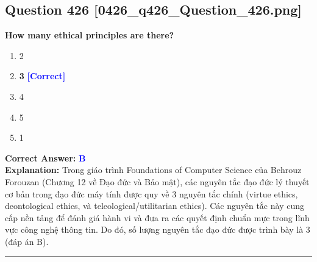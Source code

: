 \documentclass[11pt,a4paper]{article}
\begin{document}
\begin{minipage}{\textwidth}
\subsection*{Question 426 \quad \footnotesize{[0426\_q426\_Question\_426.png]}}
\noindent \textbf{How many ethical principles are there?}

\begin{enumerate}[label=\Alph*.]
    \item 2
    \item \textbf{3} \hfill \textcolor{blue}{\textbf{[Correct]}}
    \item 4
    \item 5
    \item 1
\end{enumerate}

\noindent \textbf{Correct Answer:} \textcolor{blue}{\textbf{B}} \\[2pt]
\noindent \textbf{Explanation:} Trong giáo trình Foundations of Computer Science của Behrouz Forouzan (Chương 12 về Đạo đức và Bảo mật), các nguyên tắc đạo đức lý thuyết cơ bản trong đạo đức máy tính được quy về 3 nguyên tắc chính (virtue ethics, deontological ethics, và teleological/utilitarian ethics). Các nguyên tắc này cung cấp nền tảng để đánh giá hành vi và đưa ra các quyết định chuẩn mực trong lĩnh vực công nghệ thông tin. Do đó, số lượng nguyên tắc đạo đức được trình bày là 3 (đáp án B).

\par\vspace{0.3cm}
\hrule
\vspace{0.3cm}
\end{minipage}
\end{document}
